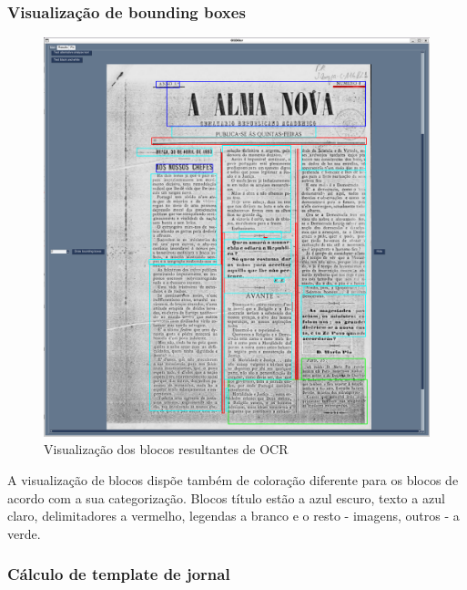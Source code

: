 \subsubsection{Visualização de bounding boxes}

\begin{figure}[H]
    \centering
    \includegraphics[width=1\textwidth]{images/implementacao/gui/gui_draw_bb.png}
    \caption{Visualização dos blocos resultantes de OCR}
    \label{fig:gui_draw_bb}
\end{figure}

A visualização de blocos dispõe também de coloração diferente para os blocos de acordo com a sua categorização. Blocos título estão a azul escuro, texto a azul claro, delimitadores a vermelho, legendas a branco e o resto - imagens, outros - a verde.

\subsubsection{Cálculo de template de jornal}

